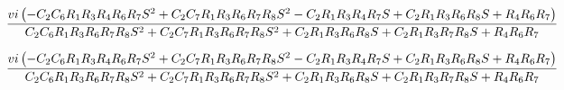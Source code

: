 \documentclass[a4paper]{article}
\begin{document}
\begin{equation}
\hspace{-3cm}
\frac{vi \left(- C_{2} C_{6} R_{1} R_{3} R_{4} R_{6} R_{7} S^{2} + C_{2} C_{7} R_{1} R_{3} R_{6} R_{7} R_{8} S^{2} - C_{2} R_{1} R_{3} R_{4} R_{7} S + C_{2} R_{1} R_{3} R_{6} R_{8} S + R_{4} R_{6} R_{7}\right)}{C_{2} C_{6} R_{1} R_{3} R_{6} R_{7} R_{8} S^{2} + C_{2} C_{7} R_{1} R_{3} R_{6} R_{7} R_{8} S^{2} + C_{2} R_{1} R_{3} R_{6} R_{8} S + C_{2} R_{1} R_{3} R_{7} R_{8} S + R_{4} R_{6} R_{7}}
\end{equation}

\begin{equation}
\hspace{-3cm}
\frac{vi \left(- C_{2} C_{6} R_{1} R_{3} R_{4} R_{6} R_{7} S^{2} + C_{2} C_{7} R_{1} R_{3} R_{6} R_{7} R_{8} S^{2} - C_{2} R_{1} R_{3} R_{4} R_{7} S + C_{2} R_{1} R_{3} R_{6} R_{8} S + R_{4} R_{6} R_{7}\right)}{C_{2} C_{6} R_{1} R_{3} R_{6} R_{7} R_{8} S^{2} + C_{2} C_{7} R_{1} R_{3} R_{6} R_{7} R_{8} S^{2} + C_{2} R_{1} R_{3} R_{6} R_{8} S + C_{2} R_{1} R_{3} R_{7} R_{8} S + R_{4} R_{6} R_{7}}
\end{equation}
\end{document}
